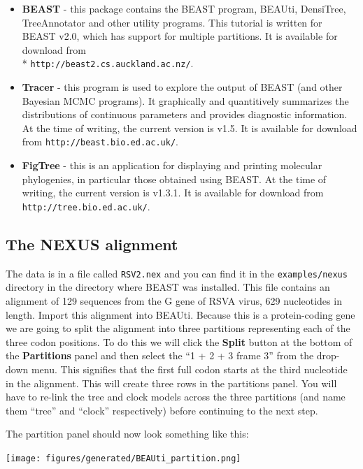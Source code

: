 \documentclass[12pt]{article}
\newcommand{\BEASTVersion}{2.0}
\newcommand{\TracerVersion}{1.5}
\newcommand{\FigTreeVersion}{1.3.1}
\begin{document}
\begin{itemize}
\item {\bf BEAST} - this package contains the BEAST program, BEAUti, DensiTree, TreeAnnotator and other utility programs. This tutorial is written for BEAST v{\BEASTVersion}, which has support for multiple partitions. It is available for download from \\* \texttt{http://beast2.cs.auckland.ac.nz/}.
\item {\bf Tracer} - this program is used to explore the output of BEAST (and other Bayesian MCMC programs). It graphically and
quantitively summarizes the distributions of continuous parameters and provides diagnostic information. At the time of
writing, the current version is v{\TracerVersion}. It is available for download from \texttt{http://beast.bio.ed.ac.uk/}.
\item {\bf FigTree} - this is an application for displaying and printing molecular phylogenies, in particular those obtained using
BEAST. At the time of writing, the current version is v{\FigTreeVersion}. It is available for download from \texttt{http://tree.bio.ed.ac.uk/}.
\end{itemize}

\subsection*{The NEXUS alignment}
The data is in a file called \texttt{RSV2.nex} and you can find it in the {\tt examples/nexus} directory in the directory where BEAST was installed. This file contains an alignment of 129 sequences from the G gene of RSVA virus, 629 nucleotides in length. Import this alignment into BEAUti. Because this is a protein-coding gene we are going to split the alignment into three partitions representing each of the three codon positions. To do this we will click the {\bf Split} button at the bottom of the {\bf Partitions} panel and then select the ``1 + 2 + 3 frame 3'' from the drop-down menu. This signifies that the first full codon starts at the third nucleotide in the alignment. This will create three rows in the partitions panel. You will have to re-link the tree and clock models across the three partitions (and name them ``tree'' and ``clock'' respectively) before continuing to the next step.

The partition panel should now look something like this:

\begin{center}
\texttt{[image: figures/generated/BEAUti\_partition.png]}
\end{center}
\end{document}
